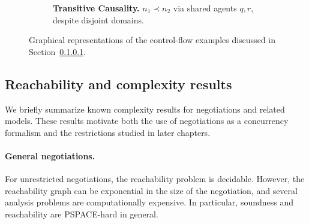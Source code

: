 \begin{figure}[p]
\vspace{1cm}

\begin{subfigure}[b]{0.45\textwidth}
\centering
{}
\caption{\textbf{Transitive Causality.} $n_1 \prec n_2$ via shared agents $q,r$, despite disjoint domains.}
\label{fig:transitive_causality}
\end{subfigure}

\caption{Graphical representations of the control-flow examples discussed in Section~\ref{}.}
\label{fig:control_flow_examples}
\end{figure}


\subsection{Reachability and complexity results}
\label{sec:complexity}

We briefly summarize known complexity results for negotiations and related models. These results motivate both the use of negotiations as a concurrency formalism and the restrictions studied in later chapters.

\paragraph{General negotiations.}
For unrestricted negotiations, the reachability problem is decidable. However, the reachability graph can be exponential in the size of the negotiation, and several analysis problems are computationally expensive. In particular, soundness and reachability are PSPACE-hard in general.

